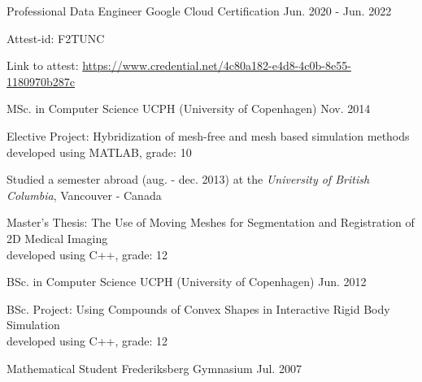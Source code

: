
% 

\begin{cventries}


\cventry
{Professional Data Engineer} %
{Google Cloud Certification} %
{} %
{Jun. 2020 - Jun. 2022} %
{ %
\begin{cvitems}
	\item {Attest-id: F2TUNC}
	\item {Link to attest: \href{https://www.credential.net/4c80a182-e4d8-4c0b-8e55-1180970b287c}{https://www.credential.net/4c80a182-e4d8-4c0b-8e55-1180970b287c}}
\end{cvitems}
}


\cventry
{MSc. in Computer Science} %
{UCPH (University of Copenhagen)} %
{} %
{Nov. 2014} %
{ %
\begin{cvitems}
\item {Elective Project: Hybridization of mesh-free and mesh based simulation methods\\
		\phantom{x}\scriptsize{developed using MATLAB, grade: 10}}
\item {Studied a semester abroad (aug. - dec. 2013) at the \textit{University of British Columbia}, Vancouver - Canada}
\item {Master's Thesis: The Use of Moving Meshes for Segmentation and Registration of 2D Medical Imaging\\
		\phantom{x}\scriptsize{developed using C++, grade: 12}}
\end{cvitems}
}

\cventry
{BSc. in Computer Science} %
{UCPH (University of Copenhagen)} %
{} %
{Jun. 2012} %
{ %
\begin{cvitems}
\item {BSc. Project: Using Compounds of Convex Shapes in Interactive Rigid Body Simulation\\
		\phantom{x}\scriptsize{developed using C++, grade: 12}}
\end{cvitems}
}

\cventry
{Mathematical Student} %
{Frederiksberg Gymnasium} %
{} %
{Jul. 2007} %
{ %
}


\end{cventries}
